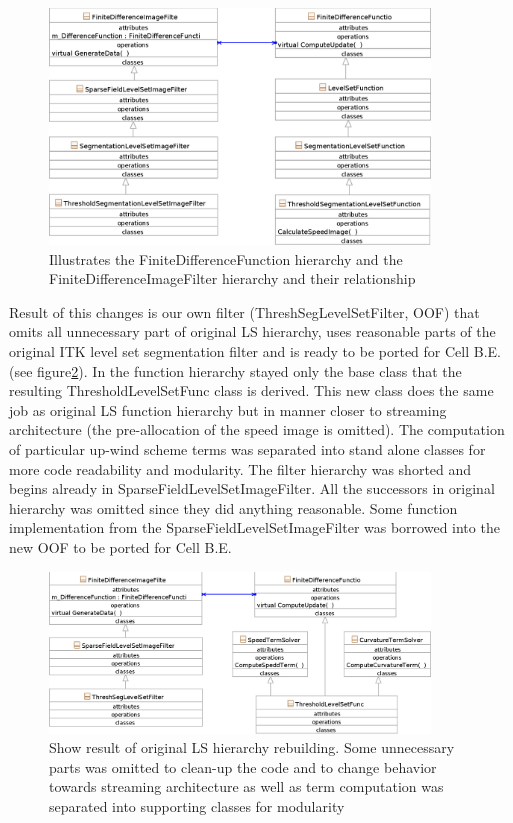 \begin{figure}
    \centering
    \includegraphics[width=0.9\textwidth]{data/originalHierarchy}
    \caption[Original ITK thresholding level set filter class hierarchy]
{Illustrates the FiniteDifferenceFunction hierarchy and the FiniteDifferenceImageFilter hierarchy and their relationship}
    \label{fg:originalHierarchy}
\end{figure}

Result of this changes is our own filter (ThreshSegLevelSetFilter, OOF) that omits all unnecessary part of original LS hierarchy, uses reasonable parts of the original ITK level set segmentation filter and is ready to be ported for Cell B.E. (see figure\ref{fg:resultingFilter}).
In the function hierarchy stayed only the base class that the resulting ThresholdLevelSetFunc class is derived.
This new class does the same job as original LS function hierarchy but in manner closer to streaming architecture (the pre-allocation of the speed image is omitted).
The computation of particular up-wind scheme terms was separated into stand alone classes for more code readability and modularity.
The filter hierarchy was shorted and begins already in SparseFieldLevelSetImageFilter.
All the successors in original hierarchy was omitted since they did anything reasonable.
Some function implementation from the SparseFieldLevelSetImageFilter was borrowed into the new OOF to be ported for Cell B.E.

\begin{figure}
    \centering
    \includegraphics[width=0.9\textwidth]{data/resultingFilter}
    \caption[Resulting level set filter ready to be ported to Cell B.E.]
    {
Show result of original LS hierarchy rebuilding.
Some unnecessary parts was omitted to clean-up the code and to change behavior towards streaming architecture as well as term computation was separated into supporting classes for modularity
    }
    \label{fg:resultingFilter}
\end{figure}

